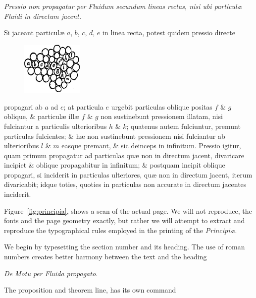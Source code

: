 \textit{Pressio non propagatur per Fluidum secundum lineas rectas, nisi
ubi particul{\ae} Fluidi in directum jacent.}

Si jaceant particul{\ae} $a$, $b$, $c$, $d$, $e$ in linea recta, potest quidem
pressio directe

\begin{figure}
  \vspace{-17pt}
  \includegraphics[width=0.27\textwidth]{images/362.png}
\end{figure}

\noindent propagari  ab $a$ ad $e$; at
particula $e$ urgebit particulas oblique positas
$f$ \& $g$ oblique, \& particul{\ae} ill{\ae} $f$ \& $g$
non sustinebunt pressionem illatam, nisi fulciantur
a particulis ulterioribus $h$ \& $k$;
quatenus autem fulciuntur, premunt particulas
fulcientes; \& h{\ae} non sustinebunt pressionem nisi fulciantur
ab ulterioribus $l$ \& $m$ easque premant, \& sic deinceps in infinitum.
Pressio igitur, quam primum propagatur ad particulas
qu{\ae} non in directum jacent, divaricare incipiet \& oblique propagabitur
in infinitum; \& postquam incipit oblique propagari, si
inciderit in particulas ulteriores, qu{\ae} non in directum jacent, iterum
divaricabit; idque toties, quoties in particulas non accurate
in directum jacentes inciderit. \QEDit

\topline

\vspace*{-\baselineskip}
\egroup
\smallskip
Figure~\ref{fig:principia}, shows a scan of the actual page. We will not reproduce, the fonts and the page geometry exactly, but rather we will attempt to extract and reproduce the typographical rules employed in the printing of the \textit{Principi\ae}.

We begin by typesetting the section number and its heading. The use of roman numbers creates better harmony between the text and the heading

\begin{teX}
\begin{center}{\textit{De Motu per Fluida propagato.}}\end{center}
\end{teX}
The proposition and theorem line, has its own command
\begin{teX}
\makeatletter
{}
\makeatother
\end{teX}

